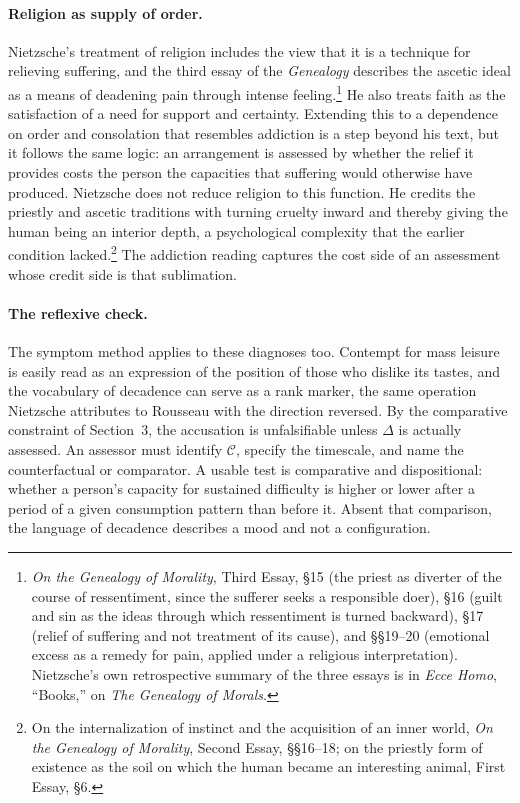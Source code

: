 \documentclass[11pt]{article}
\theoremstyle{definition}
\begin{document}
\paragraph{Religion as supply of order.} Nietzsche's treatment of religion includes the view that it is a technique for relieving suffering, and the third essay of the \emph{Genealogy} describes the ascetic ideal as a means of deadening pain through intense feeling.\footnote{\emph{On the Genealogy of Morality}, Third Essay, \S15 (the priest as diverter of the course of ressentiment, since the sufferer seeks a responsible doer), \S16 (guilt and sin as the ideas through which ressentiment is turned backward), \S17 (relief of suffering and not treatment of its cause), and \S\S19--20 (emotional excess as a remedy for pain, applied under a religious interpretation). Nietzsche's own retrospective summary of the three essays is in \emph{Ecce Homo}, ``Books,'' on \emph{The Genealogy of Morals}.} He also treats faith as the satisfaction of a need for support and certainty. Extending this to a dependence on order and consolation that resembles addiction is a step beyond his text, but it follows the same logic: an arrangement is assessed by whether the relief it provides costs the person the capacities that suffering would otherwise have produced. Nietzsche does not reduce religion to this function. He credits the priestly and ascetic traditions with turning cruelty inward and thereby giving the human being an interior depth, a psychological complexity that the earlier condition lacked.\footnote{On the internalization of instinct and the acquisition of an inner world, \emph{On the Genealogy of Morality}, Second Essay, \S\S16--18; on the priestly form of existence as the soil on which the human became an interesting animal, First Essay, \S6.} The addiction reading captures the cost side of an assessment whose credit side is that sublimation.

\paragraph{The reflexive check.} The symptom method applies to these diagnoses too. Contempt for mass leisure is easily read as an expression of the position of those who dislike its tastes, and the vocabulary of decadence can serve as a rank marker, the same operation Nietzsche attributes to Rousseau with the direction reversed. By the comparative constraint of Section~3, the accusation is unfalsifiable unless $\Delta$ is actually assessed. An assessor must identify $\mathcal{C}$, specify the timescale, and name the counterfactual or comparator. A usable test is comparative and dispositional: whether a person's capacity for sustained difficulty is higher or lower after a period of a given consumption pattern than before it. Absent that comparison, the language of decadence describes a mood and not a configuration.
\end{document}

